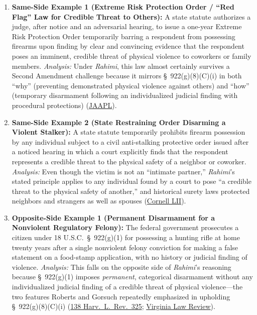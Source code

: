 \documentclass[12pt]{article}
\begin{document}
\begin{enumerate}
\item \textbf{Same-Side Example 1 (Extreme Risk Protection Order / ``Red Flag'' Law for Credible Threat to Others):} A state statute authorizes a judge, after notice and an adversarial hearing, to issue a one-year Extreme Risk Protection Order temporarily barring a respondent from possessing firearms upon finding by clear and convincing evidence that the respondent poses an imminent, credible threat of physical violence to coworkers or family members. \textit{Analysis:} Under \textit{Rahimi}, this law almost certainly survives a Second Amendment challenge because it mirrors \S\ 922(g)(8)(C)(i) in both ``why'' (preventing demonstrated physical violence against others) and ``how'' (temporary disarmament following an individualized judicial finding with procedural protections) (\href{https://jaapl.org/custom-print/68663}{JAAPL}).

\item \textbf{Same-Side Example 2 (State Restraining Order Disarming a Violent Stalker):} A state statute temporarily prohibits firearm possession by any individual subject to a civil anti-stalking protective order issued after a noticed hearing in which a court explicitly finds that the respondent represents a credible threat to the physical safety of a neighbor or coworker. \textit{Analysis:} Even though the victim is not an ``intimate partner,'' \textit{Rahimi}'s stated principle applies to any individual found by a court to pose ``a credible threat to the physical safety of another,'' and historical surety laws protected neighbors and strangers as well as spouses (\href{https://www.law.cornell.edu/supremecourt/text/22-915}{Cornell LII}).

\item \textbf{Opposite-Side Example 1 (Permanent Disarmament for a Nonviolent Regulatory Felony):} The federal government prosecutes a citizen under 18 U.S.C.\ \S\ 922(g)(1) for possessing a hunting rifle at home twenty years after a single nonviolent felony conviction for making a false statement on a food-stamp application, with no history or judicial finding of violence. \textit{Analysis:} This falls on the opposite side of \textit{Rahimi}'s reasoning because \S\ 922(g)(1) imposes \textit{permanent}, categorical disarmament without any individualized judicial finding of a credible threat of physical violence---the two features Roberts and Gorsuch repeatedly emphasized in upholding \S\ 922(g)(8)(C)(i) (\href{https://harvardlawreview.org/print/vol-138/united-states-v-rahimi/}{138 Harv.\ L.\ Rev.\ 325}; \href{https://virginialawreview.org/articles/united-states-v-rahimi-we-do-not-resolve-any-of-those-questions-because-we-cannot/}{Virginia Law Review}).


\end{enumerate}
\end{document}
